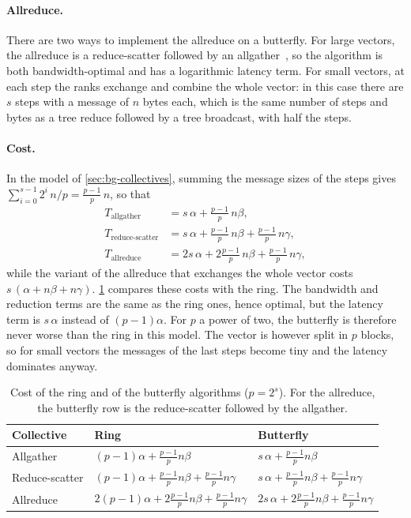 \paragraph{Allreduce.}
There are two ways to implement the allreduce on a butterfly.
For large vectors, the allreduce is a reduce-scatter followed by an allgather~\cite{thakur2005optimization}, so the algorithm is both bandwidth-optimal and has a logarithmic latency term.
For small vectors, at each step the ranks exchange and combine the whole vector: in this case there are $s$ steps with a message of $n$ bytes each, which is the same number of steps and bytes as a tree reduce followed by a tree broadcast, with half the steps.

\paragraph{Cost.}
In the model of \cref{sec:bg-collectives}, summing the message sizes of the steps gives $\sum_{i=0}^{s-1}2^{i}\,n/p=\tfrac{p-1}{p}\,n$, so that
\begin{align}
  T_{\text{allgather}} &= s\,\alpha+\tfrac{p-1}{p}\,n\beta,\\
  T_{\text{reduce-scatter}} &= s\,\alpha+\tfrac{p-1}{p}\,n\beta+\tfrac{p-1}{p}\,n\gamma,\\
  T_{\text{allreduce}} &= 2s\,\alpha+2\tfrac{p-1}{p}\,n\beta+\tfrac{p-1}{p}\,n\gamma,
  \label{eq:bg-butterfly-allreduce}
\end{align}
while the variant of the allreduce that exchanges the whole vector costs $s\,(\alpha+n\beta+n\gamma)$.
\cref{tab:bg-butterfly-cost} compares these costs with the ring.
The bandwidth and reduction terms are the same as the ring ones, hence optimal, but the latency term is $s\,\alpha$ instead of $(p-1)\alpha$.
For $p$ a power of two, the butterfly is therefore never worse than the ring in this model.
The vector is however split in $p$ blocks, so for small vectors the messages of the last steps become tiny and the latency dominates anyway.

\begin{table}[t]
\centering
\small
\caption{Cost of the ring and of the butterfly algorithms ($p=2^s$). For the allreduce, the butterfly row is the reduce-scatter followed by the allgather.}
\label{tab:bg-butterfly-cost}
\begin{tabular}{@{}lll@{}}
\toprule
Collective & Ring & Butterfly \\
\midrule
Allgather & $(p-1)\alpha+\tfrac{p-1}{p}n\beta$ & $s\,\alpha+\tfrac{p-1}{p}n\beta$ \\
Reduce-scatter & $(p-1)\alpha+\tfrac{p-1}{p}n\beta+\tfrac{p-1}{p}n\gamma$ & $s\,\alpha+\tfrac{p-1}{p}n\beta+\tfrac{p-1}{p}n\gamma$ \\
Allreduce & $2(p-1)\alpha+2\tfrac{p-1}{p}n\beta+\tfrac{p-1}{p}n\gamma$ & $2s\,\alpha+2\tfrac{p-1}{p}n\beta+\tfrac{p-1}{p}n\gamma$ \\
\bottomrule
\end{tabular}
\end{table}

